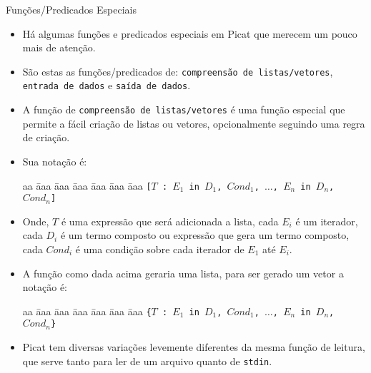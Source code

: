 \begin{frame}[c,allowframebreaks]{Funções/Predicados Especiais}
    \begin{itemize}
        
        \item Há algumas funções e predicados especiais em Picat que merecem um pouco mais de
        atenção.
        
        \item São estas as funções/predicados de: \texttt{compreensão de listas/vetores}, 
        \texttt{entrada de dados} e \texttt{saída de dados}.
        
        \framebreak
        
        \item A função de \texttt{compreensão de listas/vetores} é uma função especial que 
        permite a fácil criação de listas ou vetores, opcionalmente seguindo uma regra de 
        criação.
        
        \item Sua notação é:
        
        \begin{tabbing}
            aa \= aaa \= aaa \= aaa \= aaa \= aaa \= aaa \kill
            \> \> \texttt{[$T$ : $E_1$ \texttt{in} $D_1$, $Cond_1$, $\ldots$, $E_n$ in $D_n$, $Cond_n$]} 
        \end{tabbing}
        
        \item Onde, $T$ é uma expressão que será adicionada a lista, cada $E_i$ é um 
        iterador, cada $D_i$ é um termo composto ou expressão que gera um termo composto,
        cada $Cond_i$ é uma condição sobre cada iterador de $E_1$ até $E_i$.
        
        \item A função como dada acima geraria uma lista, para ser gerado um vetor a notação 
        é:
        
        \begin{tabbing}
            aa \= aaa \= aaa \= aaa \= aaa \= aaa \= aaa \kill
            \> \> \texttt{\{$T$ : $E_1$ \texttt{in} $D_1$, $Cond_1$, $\ldots$, $E_n$ in $D_n$, $Cond_n$\}} 
        \end{tabbing}
        
        \framebreak
        
        \item Picat tem diversas variações levemente diferentes da mesma função de leitura,
        que serve tanto para ler de um arquivo quanto de \texttt{stdin}.
        

\end{itemize}
\end{frame}
